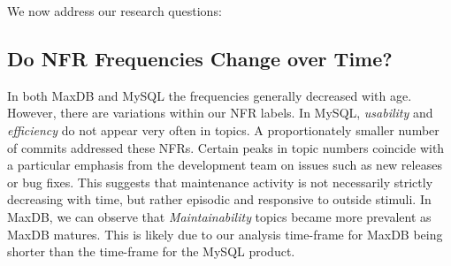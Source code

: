 \documentclass[smallextended]{svjour3}       %
\newcommand{\XXX}[1]{\textcolor{red}{{\it \textbf{[XXX: #1]}}}}
\begin{document}
We now address our research questions:



\subsection{Do NFR Frequencies Change over Time?}
In both MaxDB and MySQL the frequencies generally decreased with age. 
However, there are variations within our NFR labels. In MySQL, \emph{usability} and \emph{efficiency} do not appear very often in topics. 
A proportionately smaller number of commits addressed these NFRs.
Certain peaks in topic numbers coincide with a particular emphasis from the development team on issues such as new releases or bug fixes.
This suggests that maintenance activity is not necessarily strictly decreasing with time, but rather episodic and responsive to outside stimuli. 
In MaxDB, we can observe that \emph{Maintainability} topics became more prevalent as MaxDB matures. 
This is likely due to our analysis time-frame for MaxDB being shorter than the time-frame for the MySQL product. 
\end{document}
